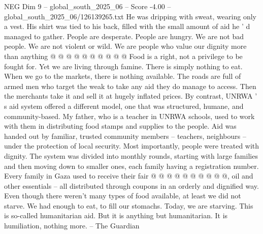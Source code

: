 \begin{textsample}{NEG Dim 9 – global\_south\_2025\_06 – Score -4.00 – global\_south\_2025\_06/126139265.txt}
He was dripping with sweat, wearing only a vest.
His shirt was tied to his back, filled with the small amount of aid he ' d managed to gather.
People are desperate.
People are hungry.
We are not bad people.
We are not violent or wild.
We are people who value our dignity more than anything @ @ @ @ @ @ @ @ @ @ Food is a right, not a privilege to be fought for.
Yet we are living through famine.
There is simply nothing to eat.
When we go to the markets, there is nothing available.
The roads are full of armed men who target the weak to take any aid they do manage to access.
Then the merchants take it and sell it at hugely inflated prices.
By contrast, UNRWA ' s aid system offered a different model, one that was structured, humane, and community-based.
My father, who is a teacher in UNRWA schools, used to work with them in distributing food stamps and supplies to the people.
Aid was handed out by familiar, trusted community members -- teachers, neighbours -- under the protection of local security.
Most importantly, people were treated with dignity.
The system was divided into monthly rounds, starting with large families and then moving down to smaller ones, each family having a registration number.
Every family in Gaza used to receive their fair @ @ @ @ @ @ @ @ @ @, oil and other essentials -- all distributed through coupons in an orderly and dignified way.
Even though there weren't many types of food available, at least we did not starve.
We had enough to eat, to fill our stomachs.
Today, we are starving.
This is so-called humanitarian aid.
But it is anything but humanitarian.
It is humiliation, nothing more. -- The Guardian

\end{textsample}

